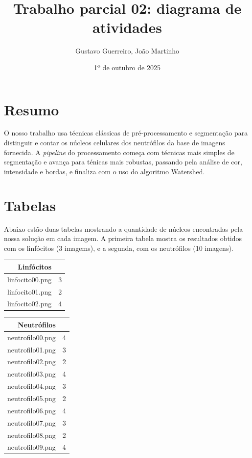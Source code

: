 \documentclass{article}
\title{Trabalho parcial 02: diagrama de atividades}
\author{Gustavo Guerreiro, João Martinho}
\date{1º de outubro de 2025}
\begin{document}
\maketitle

\section{Resumo}

O nosso trabalho usa técnicas clássicas de pré-processamento e segmentação para distinguir e contar os núcleos celulares dos neutrófilos da base de imagens fornecida. A \textit{pipeline} do processamento começa com técnicas mais simples de segmentação e avança para ténicas mais robustas, passando pela análise de cor, intensidade e bordas, e finaliza com o uso do algoritmo Watershed.

\section{Tabelas}

Abaixo estão duas tabelas mostrando a quantidade de núcleos encontradas pela nossa solução em cada imagem. A primeira tabela mostra os resultados obtidos com os linfócitos (3 imagems), e a segunda, com os neutrófilos (10 imagens).

\begin{table}[h]
\centering
\begin{minipage}{0.45\textwidth}
\centering
\begin{tabular}{|c|c|}
\hline
\multicolumn{2}{|c|}{Linfócitos} \\
\hline
linfocito00.png & 3 \\
linfocito01.png & 2 \\
linfocito02.png & 4 \\
\hline
\end{tabular}
\end{minipage}
\hfill
\begin{minipage}{0.45\textwidth}
\centering
\begin{tabular}{|c|c|}
\hline
\multicolumn{2}{|c|}{Neutrófilos} \\
\hline
neutrofilo00.png & 4 \\
neutrofilo01.png & 3 \\
neutrofilo02.png & 2 \\
neutrofilo03.png & 4 \\
neutrofilo04.png & 3 \\
neutrofilo05.png & 2 \\
neutrofilo06.png & 4 \\
neutrofilo07.png & 3 \\
neutrofilo08.png & 2 \\
neutrofilo09.png & 4 \\
\hline
\end{tabular}
\end{minipage}
\end{table}
\end{document}
